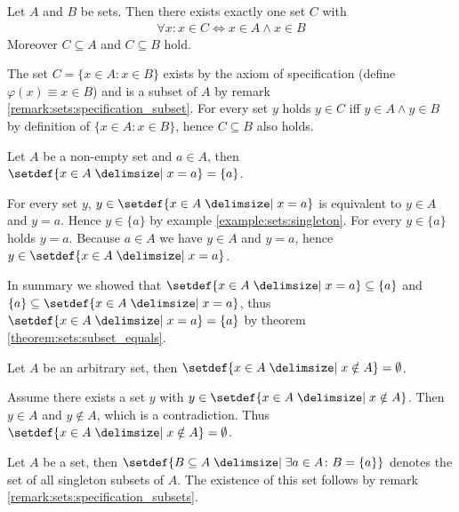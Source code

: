 \begin{examples}
    \begin{exampleenumerate}
        \item Let $A$ and $B$ be sets. Then there exists exactly one set $C$ with 
        \begin{align}\forall x\colon x\in C\Leftrightarrow x\in A\land x\in B\end{align}
        Moreover $C\subseteq A$ and $C\subseteq B$ hold.
        \begin{miniproof}
            The set $C=\{x\in A\colon x\in B\}$ exists by the axiom of specification (define $\varphi(x)\equiv x\in B$) and is a subset of $A$ by remark \ref{remark:sets:specification_subset}. For every set $y$ holds $y\in C$ iff $y\in A\land y\in B$ by definition of $\{x\in A\colon x\in B\}$, hence $C\subseteq B$ also holds.
        \end{miniproof}
        \item Let $A$ be a non-empty set and $a\in A$, then $\setdef{x\in A\given x=a}=\{a\}$.
        \begin{miniproof}
            \proofsubset For every set $y$, $y\in\setdef{x\in A\given x=a}$ is equivalent to $y\in A$ and $y=a$. Hence $y\in\{a\}$ by example \ref{example:sets:singleton}.
            \proofsupset For every $y\in\{a\}$ holds $y=a$. Because $a\in A$ we have $y\in A$ and $y=a$, hence $y\in\setdef{x\in A\given x=a}$.

            In summary we showed that $\setdef{x\in A\given x=a}\subseteq \{a\}$ and $\{a\}\subseteq\setdef{x\in A\given x=a}$, thus $\setdef{x\in A\given x=a}=\{a\}$ by theorem \ref{theorem:sets:subset_equals}.
        \end{miniproof}
        \item\label{example:sets:empty_set_specification} Let $A$ be an arbitrary set, then $\setdef{x\in A\given x\notin A}=\emptyset$.
        \begin{miniproof}
            Assume there exists a set $y$ with $y\in\setdef{x\in A\given x\notin A}$. Then $y\in A$ and $y\notin A$, which is a contradiction. Thus $\setdef{x\in A\given x\notin A}=\emptyset$.
        \end{miniproof}
        \item Let $A$ be a set, then $\setdef{B\subseteq A\given \exists a\in A\colon B=\{a\}}$ denotes the set of all singleton subsets of $A$. The existence of this set follows by remark \ref{remark:sets:specification_subsets}.
    \end{exampleenumerate}
\end{examples}


